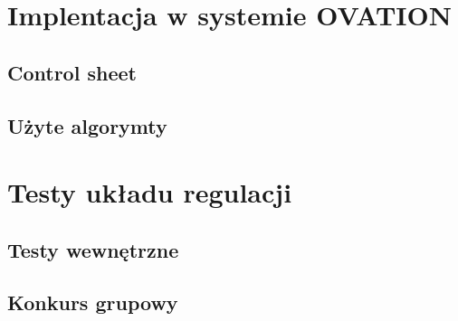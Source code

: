 \documentclass{mwrep}
\begin{document}
\chapter{Implentacja w systemie OVATION}
\label{OVATION}

\section{Control sheet}
\label{ControlSheet}

\section{Użyte algorymty}
\label{AlgorytmyOVATION}

\chapter{Testy układu regulacji}
\label{Testy}

\section{Testy wewnętrzne}
\label{TestyWewnetrzne}

\section{Konkurs grupowy}
\label{Konkurs}
\end{document}
